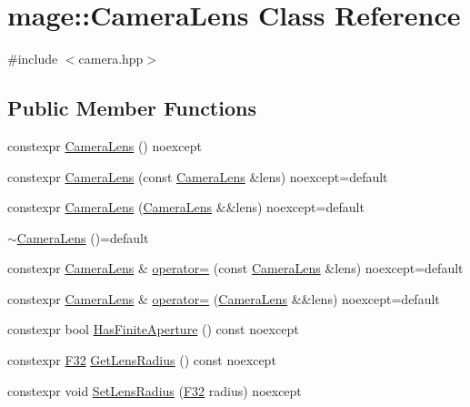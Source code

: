 \hypertarget{classmage_1_1_camera_lens}{}\section{mage\+:\+:Camera\+Lens Class Reference}
\label{classmage_1_1_camera_lens}


{\ttfamily \#include $<$camera.\+hpp$>$}

\subsection*{Public Member Functions}
\begin{DoxyCompactItemize}
\item 
constexpr \hyperlink{classmage_1_1_camera_lens_a88d52a301da313a209c7772ac83c0723}{Camera\+Lens} () noexcept
\item 
constexpr \hyperlink{classmage_1_1_camera_lens_a25ca45c6458715841e6f78d997756fe1}{Camera\+Lens} (const \hyperlink{classmage_1_1_camera_lens}{Camera\+Lens} \&lens) noexcept=default
\item 
constexpr \hyperlink{classmage_1_1_camera_lens_a00e4a71f7a386166849c8753e350e677}{Camera\+Lens} (\hyperlink{classmage_1_1_camera_lens}{Camera\+Lens} \&\&lens) noexcept=default
\item 
\hyperlink{classmage_1_1_camera_lens_a3bec59a60d52a0ef90c99fae7e5be5c1}{$\sim$\+Camera\+Lens} ()=default
\item 
constexpr \hyperlink{classmage_1_1_camera_lens}{Camera\+Lens} \& \hyperlink{classmage_1_1_camera_lens_ab3b12ac3b0f70df2d949e0ee03cad44f}{operator=} (const \hyperlink{classmage_1_1_camera_lens}{Camera\+Lens} \&lens) noexcept=default
\item 
constexpr \hyperlink{classmage_1_1_camera_lens}{Camera\+Lens} \& \hyperlink{classmage_1_1_camera_lens_a330a1e63f29d661362235dc9e3aa3c87}{operator=} (\hyperlink{classmage_1_1_camera_lens}{Camera\+Lens} \&\&lens) noexcept=default
\item 
constexpr bool \hyperlink{classmage_1_1_camera_lens_ac9b2400bf5b2187e7348b259735e4c9e}{Has\+Finite\+Aperture} () const noexcept
\item 
constexpr \hyperlink{namespacemage_aa97e833b45f06d60a0a9c4fc22ae02c0}{F32} \hyperlink{classmage_1_1_camera_lens_a218641f4d385957669a211fae3702f93}{Get\+Lens\+Radius} () const noexcept
\item 
constexpr void \hyperlink{classmage_1_1_camera_lens_a3674a66ab5e10729978953407a616cd1}{Set\+Lens\+Radius} (\hyperlink{namespacemage_aa97e833b45f06d60a0a9c4fc22ae02c0}{F32} radius) noexcept

\end{DoxyCompactItemize}
